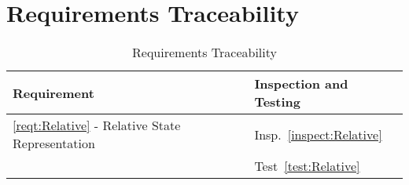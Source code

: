 \section{Requirements Traceability}

\begin{longtable}[c]{||p{3.5in}|p{3.5in}|}
\caption{Requirements Traceability} \\[6pt]
\hline
{\bf Requirement} & {\bf Inspection and Testing} \\ 
\hline \hline
\endhead
\ref{reqt:Relative} - Relative State Representation &
  Insp.~\ref{inspect:Relative} \\ 
  &
  Test~\ref{test:Relative} \\ \hline

\end{longtable}
